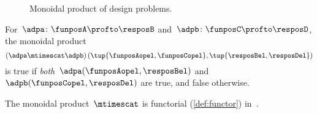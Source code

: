 \begin{figure}[h!]
	\centering
	\caption{Monoidal product of design problems.}
	\label{fig:dpmonoidal}
\end{figure}

\begin{remark}
	For~$\adpa \colon \funposA\profto \resposB$ and~$\adpb \colon \funposC \profto \resposD$, the monoidal product
	\begin{equation}
		\left(\adpa \mtimescat \adpb\right)(\tup{\funposAopel, \funposCopel}, \tup{\resposBel,\resposDel})
	\end{equation}
	is true if \emph{both}~$\adpa(\funposAopel,\resposBel)$ and~$\adpb(\funposCopel,\resposDel)$ are true, and false otherwise.
\end{remark}

\begin{lemma}
	\label{lem:monoidal_functorial}
	The monoidal product~$\mtimescat$ is functorial (\cref{def:functor}) in~\DP.
\end{lemma}
